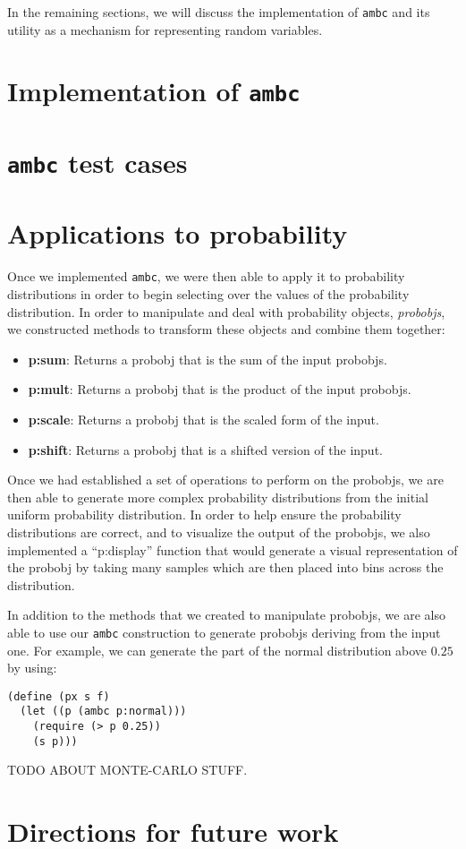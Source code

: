 \documentclass{article}
\begin{document}
In the remaining sections, we will discuss the implementation of
\texttt{ambc} and its utility as a mechanism for representing random
variables.

\section{Implementation of \texttt{ambc}}

\section{\texttt{ambc} test cases}

\section{Applications to probability}
Once we implemented \texttt{ambc}, we were then able to apply it to probability
distributions in order to begin selecting over the values of the probability
distribution. In order to manipulate and deal with probability objects,
\textit{probobjs}, we constructed methods to transform these objects and combine
them together:

\begin{itemize}
  \item \textbf{p:sum}: Returns a probobj that is the sum of the input probobjs.
  \item \textbf{p:mult}: Returns a probobj that is the product of the input probobjs.
  \item \textbf{p:scale}: Returns a probobj that is the scaled form of the input.
  \item \textbf{p:shift}: Returns a probobj that is a shifted version of the
    input.
\end{itemize}

Once we had established a set of operations to perform on the probobjs, we are
then able to generate more complex probability distributions from the initial
uniform probability distribution. In order to help ensure the probability
distributions are correct, and to visualize the output of the probobjs, we also
implemented a ``p:display'' function that would generate a visual representation
of the probobj by taking many samples which are then placed into bins across the
distribution.

In addition to the methods that we created to manipulate probobjs, we are also
able to use our \texttt{ambc} construction to generate probobjs deriving from
the input one. For example, we can generate the part of the normal distribution
above $0.25$ by using:\\

\begin{lstlisting}
(define (px s f) 
  (let ((p (ambc p:normal))) 
    (require (> p 0.25))
    (s p)))
\end{lstlisting}

TODO ABOUT MONTE-CARLO STUFF.
\section{Directions for future work}
\end{document}
